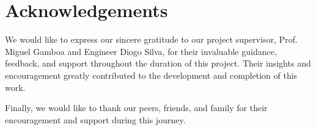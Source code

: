 \section*{Acknowledgements}

We would like to express our sincere gratitude to our project supervisor, Prof. Miguel Gamboa and Engineer Diogo Silva, for their invaluable guidance, feedback, and support throughout the duration of this project. Their insights and encouragement greatly contributed to the development and completion of this work.

Finally, we would like to thank our peers, friends, and family for their encouragement and support during this journey.

